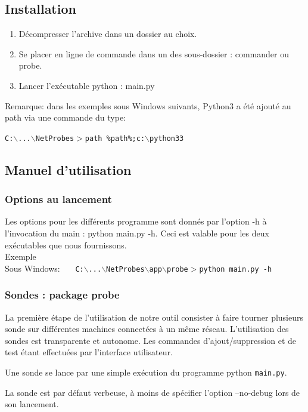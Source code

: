 \documentclass[a4paper,11pt]{article}
\begin{document}
\subsection{Installation}
\begin{enumerate}
\item Décompresser l'archive dans un dossier au choix.
\item Se placer en ligne de commande dans un des sous-dossier : commander ou probe.
\item Lancer l'exécutable python : main.py
\end{enumerate}
Remarque: dans les exemples sous Windows suivants, Python3 a été ajouté au path via une commande du type:
\begin{center} \texttt{C:$\backslash$...$\backslash$NetProbes$>$path \%path\%;c:$\backslash$python33} \end{center}

\subsection{Manuel d'utilisation}

\subsubsection{Options au lancement}
Les options pour les différents programme sont donnés par l'option -h à l'invocation du main : python main.py -h.
Ceci est valable pour les deux exécutables que nous fournissons.\\
Exemple\\
Sous Windows: \ \ \ \texttt{C:$\backslash$...$\backslash$NetProbes$\backslash$app$\backslash$probe$>$python main.py -h}

\subsubsection{Sondes : package probe}
La première étape de l'utilisation de notre outil consister à faire tourner plusieurs sonde sur différentes machines connectées à un même réseau. L'utilisation des sondes est transparente et autonome. Les commandes d'ajout/suppression et de test étant effectuées par l'interface utilisateur.

Une sonde se lance par une simple exécution du programme python \texttt{main.py}.

La sonde est par défaut verbeuse, à moins de spécifier l'option --no-debug lors de son lancement.
\end{document}
